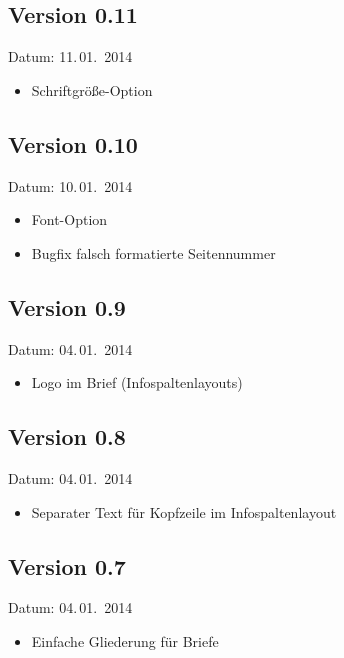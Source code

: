 \subsection{Version 0.11}

Datum: 11.\,01.~2014

\begin{itemize}
	\item Schriftgröße-Option 
\end{itemize}

\subsection{Version 0.10}

Datum: 10.\,01.~2014

\begin{itemize}
	\item Font-Option 
	\item Bugfix falsch formatierte Seitennummer
\end{itemize}

\subsection{Version 0.9}

Datum: 04.\,01.~2014

\begin{itemize}
	\item Logo im Brief (Infospaltenlayouts)
\end{itemize}

\subsection{Version 0.8}

Datum: 04.\,01.~2014

\begin{itemize}
	\item Separater Text für Kopfzeile im Infospaltenlayout
\end{itemize}

\subsection{Version 0.7}

Datum: 04.\,01.~2014

\begin{itemize}
	\item Einfache Gliederung für Briefe
\end{itemize}

